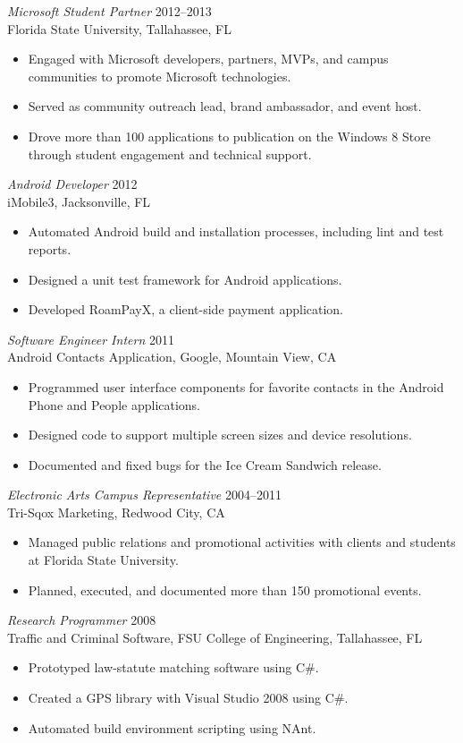 \documentclass[margin]{res}
\begin{document}
\begin{resume}
{\sl Microsoft Student Partner} \hfill 2012--2013\\
Florida State University, Tallahassee, FL
\begin{itemize}
\item Engaged with Microsoft developers, partners, MVPs, and campus communities to promote Microsoft technologies.
\item Served as community outreach lead, brand ambassador, and event host.
\item Drove more than 100 applications to publication on the Windows 8 Store through student engagement and technical support.
\end{itemize}

{\sl Android Developer} \hfill 2012\\
iMobile3, Jacksonville, FL
\begin{itemize}
\item Automated Android build and installation processes, including lint and test reports.
\item Designed a unit test framework for Android applications.
\item Developed RoamPayX, a client-side payment application.
\end{itemize}

{\sl Software Engineer Intern} \hfill 2011\\
Android Contacts Application, Google, Mountain View, CA
\begin{itemize}
\item Programmed user interface components for favorite contacts in the Android Phone and People applications.
\item Designed code to support multiple screen sizes and device resolutions.
\item Documented and fixed bugs for the Ice Cream Sandwich release.
\end{itemize}

{\sl Electronic Arts Campus Representative} \hfill 2004--2011\\
Tri-Sqox Marketing, Redwood City, CA
\begin{itemize}
\item Managed public relations and promotional activities with clients and students at Florida State University.
\item Planned, executed, and documented more than 150 promotional events.
\end{itemize}

{\sl Research Programmer} \hfill 2008\\
Traffic and Criminal Software, FSU College of Engineering, Tallahassee, FL
\begin{itemize}
\item Prototyped law-statute matching software using C\#.
\item Created a GPS library with Visual Studio 2008 using C\#.
\item Automated build environment scripting using NAnt.
\end{itemize}


\end{resume}
\end{document}
